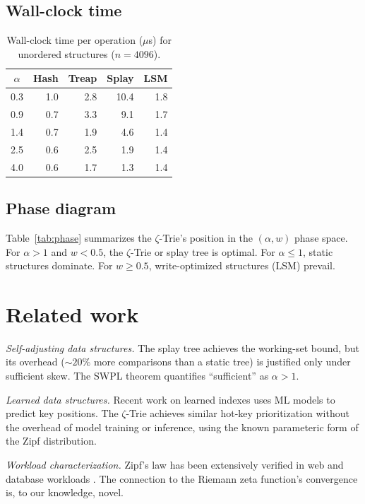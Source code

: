 \documentclass[preprint,12pt,authoryear]{elsarticle}
\begin{document}
\subsection{Wall-clock time}

\begin{table}[t]
\centering
\caption{Wall-clock time per operation ($\mu$s) for unordered
structures ($n=4096$).}
\label{tab:wall}
\begin{tabular}{crrrr}
\toprule
$\alpha$ & Hash & Treap & Splay & LSM \\
\midrule
0.3 & 1.0 & 2.8 & 10.4 & 1.8 \\
0.9 & 0.7 & 3.3 & 9.1 & 1.7 \\
1.4 & 0.7 & 1.9 & 4.6 & 1.4 \\
2.5 & 0.6 & 2.5 & 1.9 & 1.4 \\
4.0 & 0.6 & 1.7 & 1.3 & 1.4 \\
\bottomrule
\end{tabular}
\end{table}

\subsection{Phase diagram}

Table~\ref{tab:phase} summarizes the $\zeta$-Trie's position in
the $( \alpha, w)$ phase space.  For $\alpha > 1$ and $w < 0.5$,
the $\zeta$-Trie or splay tree is optimal.  For $\alpha \le 1$,
static structures dominate.  For $w \ge 0.5$, write-optimized
structures (LSM) prevail.

\section{Related work}

\emph{Self-adjusting data structures.}  The splay tree \cite{sleator85}
achieves the working-set bound, but its overhead ($\sim 20\%$ more
comparisons than a static tree) is justified only under sufficient
skew.  The SWPL theorem quantifies ``sufficient'' as $\alpha > 1$.

\emph{Learned data structures.}  Recent work on learned indexes
\cite{kraska18} uses ML models to predict key positions.  The
$\zeta$-Trie achieves similar hot-key prioritization without the
overhead of model training or inference, using the known
parameteric form of the Zipf distribution.

\emph{Workload characterization.}  Zipf's law has been extensively
verified in web \cite{breslau99} and database workloads
\cite{graefe15}.  The connection to the Riemann zeta function's
convergence is, to our knowledge, novel.
\end{document}
